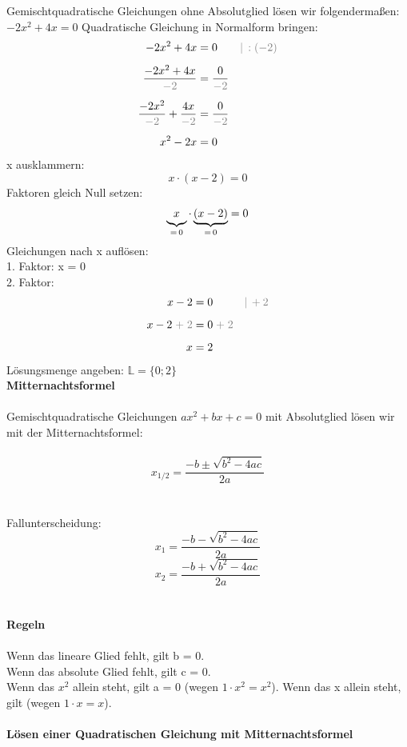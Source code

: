 \documentclass[a4paper,10pt]{article}
\begin{document}
\begin{multicols}{3}
    Gemischtquadratische Gleichungen ohne Absolutglied lösen wir folgendermaßen: \\
    $-2x^2 + 4x = 0$ Quadratische Gleichung in Normalform bringen: \\
    \begin{align*} -2x^2 + 4x &= 0 &&{\color{gray}|\, :(-2)} \\[5px] \frac{-2x^2 + 4x}{\color{gray}-2} &= \frac{0}{\color{gray}-2} \\[5px] \frac{-2x^2}{\color{gray}-2} + \frac{4x}{\color{gray}-2} &= \frac{0}{\color{gray}-2} \\[5px] x^2 - 2x &= 0 \end{align*}
    x ausklammern: \\
    \[x \cdot (x - 2) = 0\]
    Faktoren gleich Null setzen:\\
    \[\underbrace{x\vphantom{()}}_{=\,0} \cdot \underbrace{(x - 2)}_{=\,0} = 0\]
    Gleichungen nach x auflösen: \\
    1. Faktor: x = 0 \\
    2. Faktor:
    \begin{align*} x - 2 &= 0 &&{\color{gray}|\, +2} \\[5px] x - 2 {\color{gray}\;+\;2} &= 0 {\color{gray}\;+\;2} \\[5px] x &= 2 \end{align*}
    Lösungsmenge angeben:  $    \mathbb{L} = \{0; 2\}$ \\
    \textbf{Mitternachtsformel}\\~\\
    Gemischtquadratische Gleichungen $ax^2 + bx + c = 0$ mit Absolutglied lösen wir mit der Mitternachtsformel:\\~\\
    \[x_{1/2} = \frac{-b \pm \sqrt{b^2 - 4ac}}{2a}\]\\~\\
    Fallunterscheidung:
    \[x_{1} = \dfrac{-b - \sqrt{b^2 - 4ac}}{2a}\]
    \[x_{2} = \dfrac{-b + \sqrt{b^2 - 4ac}}{2a}\]\\~\\
    \textbf{Regeln}\\~\\
    Wenn das lineare Glied fehlt, gilt b = 0. \\
    Wenn das absolute Glied fehlt, gilt c = 0. \\
    Wenn das $x^2$ allein steht, gilt a = 0 (wegen $1 \cdot x^2 = x^2$).
    Wenn das x allein steht, gilt (wegen $1 \cdot x = x$).\\~\\
    \textbf{Lösen einer Quadratischen Gleichung mit Mitternachtsformel}\\~\\


\end{multicols}
\end{document}
